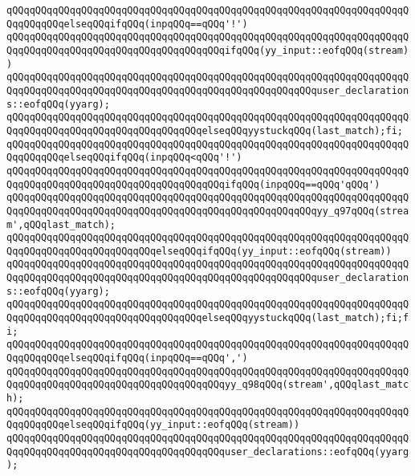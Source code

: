 \verb|qQQqqQQqqQQqqQQqqQQqqQQqqQQqqQQqqQQqqQQqqQQqqQQqqQQqqQQqqQQqqQQqqQQqqQQqqQQqqQQqelseqQQqifqQQq(inpqQQq==qQQq'!')|\newline
\verb|qQQqqQQqqQQqqQQqqQQqqQQqqQQqqQQqqQQqqQQqqQQqqQQqqQQqqQQqqQQqqQQqqQQqqQQqqQQqqQQqqQQqqQQqqQQqqQQqqQQqqQQqqQQqifqQQq(yy_input::eofqQQq(stream))|\newline
\verb|qQQqqQQqqQQqqQQqqQQqqQQqqQQqqQQqqQQqqQQqqQQqqQQqqQQqqQQqqQQqqQQqqQQqqQQqqQQqqQQqqQQqqQQqqQQqqQQqqQQqqQQqqQQqqQQqqQQqqQQqqQQquser_declarations::eofqQQq(yyarg);|\newline
\verb|qQQqqQQqqQQqqQQqqQQqqQQqqQQqqQQqqQQqqQQqqQQqqQQqqQQqqQQqqQQqqQQqqQQqqQQqqQQqqQQqqQQqqQQqqQQqqQQqqQQqqQQqelseqQQqyystuckqQQq(last_match);fi;|\newline
\verb|qQQqqQQqqQQqqQQqqQQqqQQqqQQqqQQqqQQqqQQqqQQqqQQqqQQqqQQqqQQqqQQqqQQqqQQqqQQqqQQqelseqQQqifqQQq(inpqQQq<qQQq'!')|\newline
\verb|qQQqqQQqqQQqqQQqqQQqqQQqqQQqqQQqqQQqqQQqqQQqqQQqqQQqqQQqqQQqqQQqqQQqqQQqqQQqqQQqqQQqqQQqqQQqqQQqqQQqqQQqqQQqifqQQq(inpqQQq==qQQq'qQQq')|\newline
\verb|qQQqqQQqqQQqqQQqqQQqqQQqqQQqqQQqqQQqqQQqqQQqqQQqqQQqqQQqqQQqqQQqqQQqqQQqqQQqqQQqqQQqqQQqqQQqqQQqqQQqqQQqqQQqqQQqqQQqqQQqqQQqyy_q97qQQq(stream',qQQqlast_match);|\newline
\verb|qQQqqQQqqQQqqQQqqQQqqQQqqQQqqQQqqQQqqQQqqQQqqQQqqQQqqQQqqQQqqQQqqQQqqQQqqQQqqQQqqQQqqQQqqQQqqQQqelseqQQqifqQQq(yy_input::eofqQQq(stream))|\newline
\verb|qQQqqQQqqQQqqQQqqQQqqQQqqQQqqQQqqQQqqQQqqQQqqQQqqQQqqQQqqQQqqQQqqQQqqQQqqQQqqQQqqQQqqQQqqQQqqQQqqQQqqQQqqQQqqQQqqQQqqQQqqQQquser_declarations::eofqQQq(yyarg);|\newline
\verb|qQQqqQQqqQQqqQQqqQQqqQQqqQQqqQQqqQQqqQQqqQQqqQQqqQQqqQQqqQQqqQQqqQQqqQQqqQQqqQQqqQQqqQQqqQQqqQQqqQQqqQQqelseqQQqyystuckqQQq(last_match);fi;fi;|\newline
\verb|qQQqqQQqqQQqqQQqqQQqqQQqqQQqqQQqqQQqqQQqqQQqqQQqqQQqqQQqqQQqqQQqqQQqqQQqqQQqqQQqelseqQQqifqQQq(inpqQQq==qQQq',')|\newline
\verb|qQQqqQQqqQQqqQQqqQQqqQQqqQQqqQQqqQQqqQQqqQQqqQQqqQQqqQQqqQQqqQQqqQQqqQQqqQQqqQQqqQQqqQQqqQQqqQQqqQQqqQQqqQQqyy_q98qQQq(stream',qQQqlast_match);|\newline
\verb|qQQqqQQqqQQqqQQqqQQqqQQqqQQqqQQqqQQqqQQqqQQqqQQqqQQqqQQqqQQqqQQqqQQqqQQqqQQqqQQqelseqQQqifqQQq(yy_input::eofqQQq(stream))|\newline
\verb|qQQqqQQqqQQqqQQqqQQqqQQqqQQqqQQqqQQqqQQqqQQqqQQqqQQqqQQqqQQqqQQqqQQqqQQqqQQqqQQqqQQqqQQqqQQqqQQqqQQqqQQqqQQquser_declarations::eofqQQq(yyarg);|\newline
